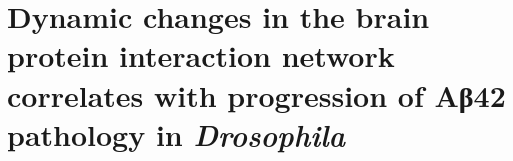 

\chapter{Dynamic changes in the brain protein interaction network correlates with progression of Aβ42 pathology in \textit{Drosophila}}
\label{chapter:fly}



